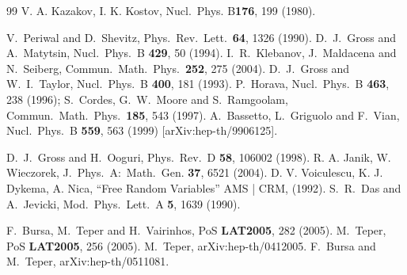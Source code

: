 \begin{thebibliography}{99}
V. A. Kazakov, I. K. Kostov, Nucl.\ Phys. B{\bf 176}, 199 (1980).

V.~Periwal and D.~Shevitz,
  Phys.\ Rev.\ Lett.\  {\bf 64}, 1326 (1990).
  D.~J.~Gross and A.~Matytsin,
  Nucl.\ Phys.\ B {\bf 429}, 50 (1994).
I.~R.~Klebanov, J.~Maldacena and N.~Seiberg,
  Commun.\ Math.\ Phys.\  {\bf 252}, 275 (2004).
D.~J.~Gross and W.~I.~Taylor,
  Nucl.\ Phys.\ B {\bf 400}, 181 (1993).
P.~Horava,
  Nucl.\ Phys.\ B {\bf 463}, 238 (1996);
S.~Cordes, G.~W.~Moore and S.~Ramgoolam,
  Commun.\ Math.\ Phys.\  {\bf 185}, 543 (1997).
  A.~Bassetto, L.~Griguolo and F.~Vian,
  Nucl.\ Phys.\ B {\bf 559}, 563 (1999)
  [arXiv:hep-th/9906125].

D.~J.~Gross and H.~Ooguri,
  Phys.\ Rev.\ D {\bf 58}, 106002 (1998).
 R. A. Janik, W. Wieczorek, J.\ Phys.\ A:\ Math.\ Gen.
{\bf 37}, 6521 (2004).
D. V. Voiculescu, K. J. Dykema, A. Nica, ``Free Random Variables'' AMS | CRM,
(1992).
S.~R.~Das and A.~Jevicki,
  Mod.\ Phys.\ Lett.\ A {\bf 5}, 1639 (1990).

F.~Bursa, M.~Teper and H.~Vairinhos,
  PoS {\bf LAT2005}, 282 (2005).
 M.~Teper,
  PoS {\bf LAT2005}, 256 (2005).
  M.~Teper,
  arXiv:hep-th/0412005.
F.~Bursa and M.~Teper,
  arXiv:hep-th/0511081.


\end{thebibliography}
